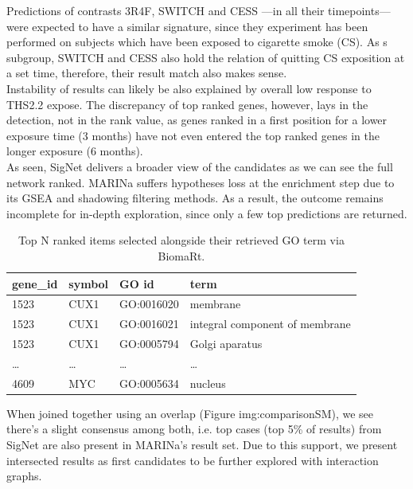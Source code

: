 Predictions of contrasts 3R4F, SWITCH and CESS —in all their timepoints—were expected to have a similar signature, since they experiment has been performed on subjects which have been exposed to cigarette smoke (CS). As s subgroup, SWITCH and CESS also hold the relation of quitting CS exposition at a set time, therefore, their result match also makes sense.
\\

Instability of results can likely be also explained by overall low response to THS2.2 expose. The discrepancy of top ranked genes, however, lays in the detection, not in the rank value, as genes ranked in a first position for a lower exposure time (3 months) have not even entered the top ranked genes in the longer exposure (6 months).
\\

As seen, SigNet delivers a broader view of the candidates as we can see the full network ranked. MARINa suffers hypotheses loss at the enrichment step due to its GSEA and shadowing filtering methods. As a result, the outcome remains incomplete for in-depth exploration, since only a few top predictions are returned.
\\

\begin{table}[]
\centering
\begin{tabular}{|l|l|l|l|}
\hline
gene\_id & symbol & GO id      & term                           \\ \hline
1523     & CUX1   & GO:0016020 & membrane                       \\ \hline
1523     & CUX1   & GO:0016021 & integral component of membrane \\ \hline
1523     & CUX1   & GO:0005794 & Golgi aparatus                 \\ \hline
…        & …      & …          & …                              \\ \hline
4609     & MYC    & GO:0005634 & nucleus                        \\ \hline
\end{tabular}
\caption{Top N ranked items selected alongside their retrieved GO term via BiomaRt.}
\label{tbl:goterms}
\end{table}

When joined together using an overlap (Figure img:comparisonSM), we see there’s a slight consensus among both, i.e. top cases (top 5\% of results) from SigNet are also present in MARINa’s result set. Due to this support, we present intersected results as first candidates to be further explored with interaction graphs.
\\


